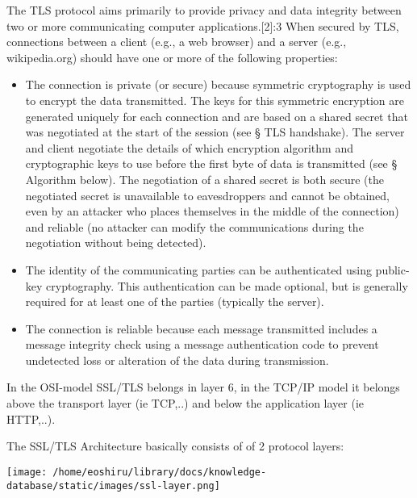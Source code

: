 \documentclass[11pt]{article}
\begin{document}
The TLS protocol aims primarily to provide privacy and data integrity between two or more communicating computer applications.[2]:3 When secured by TLS, connections between a client (e.g., a web browser) and a server (e.g., wikipedia.org) should have one or more of the following properties:
\begin{itemize}
\item The connection is private (or secure) because symmetric cryptography is used to encrypt the data transmitted. The keys for this symmetric encryption are generated uniquely for each connection and are based on a shared secret that was negotiated at the start of the session (see § TLS handshake). The server and client negotiate the details of which encryption algorithm and cryptographic keys to use before the first byte of data is transmitted (see § Algorithm below). The negotiation of a shared secret is both secure (the negotiated secret is unavailable to eavesdroppers and cannot be obtained, even by an attacker who places themselves in the middle of the connection) and reliable (no attacker can modify the communications during the negotiation without being detected).
\item The identity of the communicating parties can be authenticated using public-key cryptography. This authentication can be made optional, but is generally required for at least one of the parties (typically the server).
\item The connection is reliable because each message transmitted includes a message integrity check using a message authentication code to prevent undetected loss or alteration of the data during transmission.
\end{itemize}

In the OSI-model SSL/TLS belongs in layer 6, in the TCP/IP model it belongs above the transport layer (ie TCP,..) and below the application layer (ie HTTP,..).

The SSL/TLS Architecture basically consists of of 2 protocol layers:\\
\begin{center}
\texttt{[image: /home/eoshiru/library/docs/knowledge-database/static/images/ssl-layer.png]}
\end{center}
\end{document}
